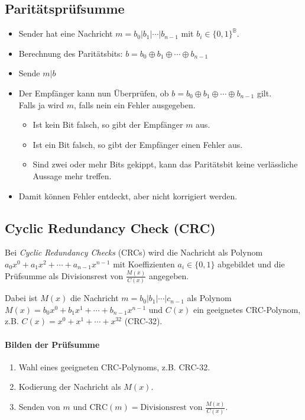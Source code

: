 \documentclass[a4paper, 11pt, accentcolor = tud3b]{tudreport}
\begin{document}
            \subsection{Paritätsprüfsumme}
	            \begin{itemize}
	            	\item Sender hat eine Nachricht \( m = b_0 \vert b_1 \vert \cdots \vert b_{n - 1} \) mit \( b_i \in \{0,1\}^\mathbb{B} \).
	            	\item Berechnung des Paritätsbits: \( b = b_0 \oplus b_1 \oplus \cdots \oplus b_{n-1} \)
	            	\item Sende \( m \vert b \)
	            	\item Der Empfänger kann nun Überprüfen, ob \( b = b_0 \oplus b_1 \oplus \cdots \oplus b_{n-1} \) gilt. \\ Falls ja wird \(m\), falls nein ein Fehler ausgegeben.
		            	\begin{itemize}
			            	\item Ist kein Bit falsch, so gibt der Empfänger \(m\) aus.
			            	\item Ist ein Bit falsch, so gibt der Empfänger einen Fehler aus.
			            	\item Sind zwei oder mehr Bits gekippt, kann das Paritätsbit keine verlässliche Aussage mehr treffen.
		            	\end{itemize}
	            	\item Damit können Fehler entdeckt, aber nicht korrigiert werden.
	            \end{itemize}

            \subsection{Cyclic Redundancy Check (CRC)}
                Bei \textit{Cyclic Redundancy Checks} (CRCs)  wird die Nachricht als Polynom \( a_0x^0 + a_1x^2 + \cdots + a_{n-1}x^{n-1} \) mit Koeffizienten \( a_i \in \{0,1\} \) abgebildet und die Prüfsumme als Divisionsrest von \( \frac{M(x)}{C(x)} \) angegeben.
                
                Dabei ist \( M(x) \) die Nachricht \( m = b_0 \vert b_1 \vert \cdots \vert c_{n-1} \) als Polynom \( M(x) = b_0x^0 + b_1x^1 + \cdots + b_{n-1}x^{n-1} \) und \(C(x)\) ein geeignetes CRC-Polynom, z.B. \( C(x) = x^0 + x^1 + \cdots + x^32 \) (CRC-32).
                
                \paragraph{Bilden der Prüfsumme}
	                \begin{enumerate}
	                	\item Wahl eines geeigneten CRC-Polynoms, z.B. CRC-32.
	                	\item Kodierung der Nachricht als \( M(x) \).
	                	\item Senden von \(m\) und \( \textrm{CRC}(m) = \textrm{Divisionsrest von } \frac{M(x)}{C(x)} \).
	                \end{enumerate}
                
\end{document}
